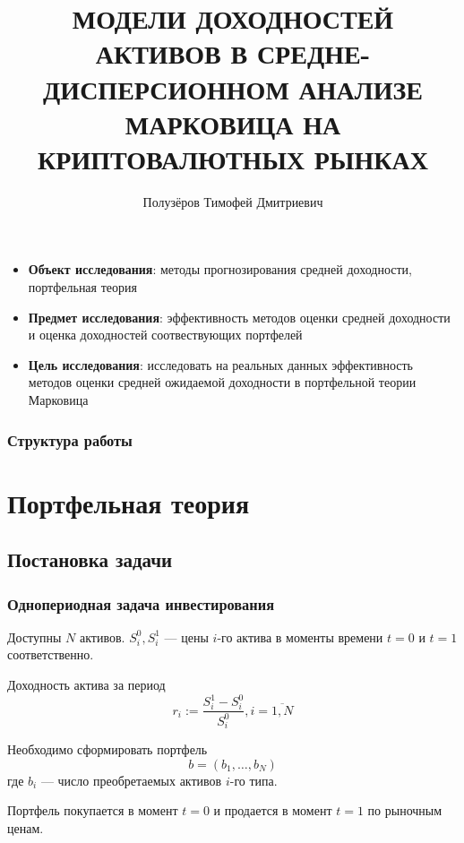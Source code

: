\documentclass{beamer}
\title[]{МОДЕЛИ ДОХОДНОСТЕЙ АКТИВОВ В СРЕДНЕ-ДИСПЕРСИОННОМ АНАЛИЗЕ МАРКОВИЦА НА КРИПТОВАЛЮТНЫХ РЫНКАХ}
\subtitle{}
\author[Полузёров Т. Д.]{Полузёров Тимофей Дмитриевич}
\institute[]{Научный руководитель Харин Алексей Юрьевич}
\date{}
\begin{document}
\begin{frame}
    \titlepage
\end{frame}

\begin{frame}
    \begin{itemize}
        \item \textbf{Объект исследования}: методы прогнозирования средней доходности, портфельная теория
        
        \item \textbf{Предмет исследования}: эффективность методов оценки средней доходности и 
        оценка доходностей соотвествующих портфелей
        
        \item \textbf{Цель исследования}: исследовать на реальных данных эффективность методов
        оценки средней ожидаемой доходности в портфельной теории Марковица
    \end{itemize}
\end{frame}

\begin{frame}
    \begin{center}
        \frametitle{Структура работы}
        \tableofcontents
    \end{center}
\end{frame}

\section{Портфельная теория}

\subsection{Постановка задачи}

\begin{frame}
    \frametitle{Однопериодная задача инвестирования}
    Доступны $N$ активов.
    $S_i^0, S_i^1$ --- цены $i$-го актива в моменты времени $t=0$ и
    $t=1$ соответственно.

    Доходность актива за период
    \[
        r_i := \frac{S_i^1 - S_i^0}{S_i^0}, i=\overline{1, N}
    \]

    Необходимо сформировать портфель
    \[
        b = (b_1, \dots, b_N)
    \]
    где $b_i$ --- число преобретаемых активов $i$-го типа.

    Портфель покупается в момент $t=0$ и продается в момент $t=1$ по рыночным ценам.
\end{frame}
\end{document}
